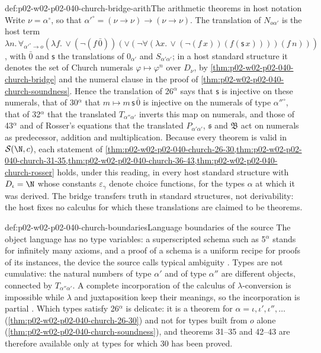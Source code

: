 \begin{hbexample}{def:p02-w02-p02-040-church-bridge-arith}{The arithmetic theorems in host notation}
Write \(\nu=\alpha^\circ\), so that \(\alpha'^\circ=(\nu\to\nu)\to(\nu\to\nu)\).
The translation of \(N_{o\alpha'}\) is the host term
\(\lambda n.\,\forall_{\alpha'^\circ\to o}(\lambda f.\,\lor(\neg(f\,\bar0))(\lor(\neg\forall(\lambda x.\,\lor(\neg(f\,x))(f(\mathsf s\,x))))(f\,n)))\),
with \(\bar0\) and \(\mathsf s\) the translations of \(0_{\alpha'}\) and
\(S_{\alpha'\alpha'}\); in a host standard structure it denotes the set of
Church numerals \(\varphi\mapsto\varphi^n\) over \(D_\nu\), by
\cref{thm:p02-w02-p02-040-church-bridge} and the numeral clause in the proof
of \cref{thm:p02-w02-p02-040-church-soundness}.  Hence the translation of
26\(^\alpha\) says that \(\mathsf s\) is injective on these numerals, that of
30\(^\alpha\) that \(m\mapsto m\,\mathsf s\,\bar0\) is injective on the numerals
of type \(\alpha''^\circ\), that of 32\(^\alpha\) that the translated
\(T_{\alpha''\alpha'}\) inverts this map on numerals, and those of 43\(^\alpha\)
and of Rosser's equations that the translated \(P_{\alpha'\alpha'}\),
\(\mathfrak s\) and \(\mathfrak B\) act on numerals as predecessor, addition
and multiplication.  Because every theorem is valid in \(\mathcal S(\N,c)\),
each statement of \cref{thm:p02-w02-p02-040-church-26-30,thm:p02-w02-p02-040-church-31-35,thm:p02-w02-p02-040-church-36-43,thm:p02-w02-p02-040-church-rosser}
holds, under this reading, in every host standard structure with
\(D_\iota=\N\) whose constants \(\varepsilon_\gamma\) denote choice functions,
for the types \(\alpha\) at which it was derived.  The bridge transfers truth
in standard structures, not derivability: the host fixes no calculus for
which these translations are claimed to be theorems.
\end{hbexample}

\begin{hbwarning}{def:p02-w02-p02-040-church-boundaries}{Language boundaries of the source}
The object language has no type variables: a superscripted schema such as
5\(^\alpha\) stands for infinitely many axioms, and a proof of a schema is
a uniform recipe for proofs of its instances, the device the source calls
typical ambiguity \cite[\S5, p.~63, n.~10]{Church1940}.  Types are not
cumulative: the natural numbers of type \(\alpha'\) and of type
\(\alpha''\) are different objects, connected by \(T_{\alpha''\alpha'}\).
A complete incorporation of the calculus of \(\lambda\)-conversion is
impossible while \(\lambda\) and juxtaposition keep their meanings, so the
incorporation is partial \cite[p.~56]{Church1940}.  Which types satisfy
26\(^\alpha\) is delicate: it is a theorem for \(\alpha=\iota,\iota',\iota'',\ldots\)
(\cref{thm:p02-w02-p02-040-church-26-30}) and not for types built from \(o\)
alone (\cref{thm:p02-w02-p02-040-church-soundness}), and theorems 31--35 and
42--43 are therefore available only at types for which 30 has been proved.
\end{hbwarning}

